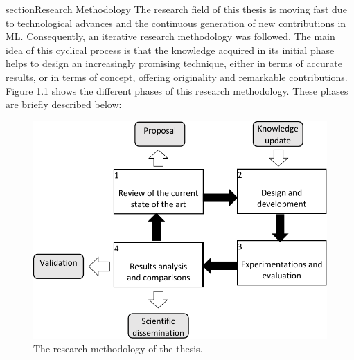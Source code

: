 section{Research Methodology}
\label{sec:1_introduction_methodology}
The research field of this thesis is moving fast due to technological advances and the continuous generation of new contributions in ML. Consequently, an iterative research methodology was followed. The main idea of this cyclical process is that the knowledge acquired in its initial phase helps to design an increasingly promising technique,
either in terms of accurate results, or in terms of concept, offering originality and remarkable contributions. Figure 1.1 shows the different phases of this research methodology.
These phases are briefly described below:

\begin{figure}[!ht]
    \centering
    \includegraphics[width=.8\textwidth]{1_introduction/figures/fig_research-methodo.pdf}
    \caption{The research methodology of the thesis.}
    \label{ch1:research-emthodo}
\end{figure}

